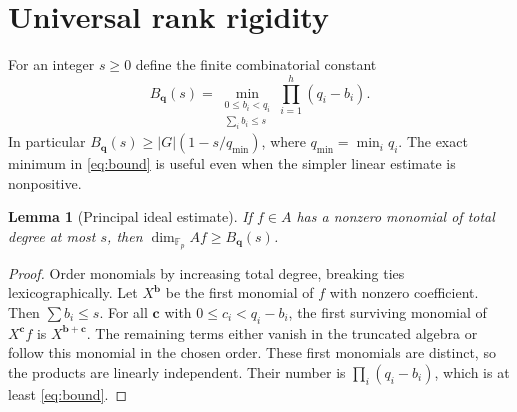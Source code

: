\documentclass[11pt,a4paper]{article}
\newtheorem{lemma}[theorem]{Lemma}
\theoremstyle{definition}
\theoremstyle{remark}
\newcommand{\Fp}{\mathbb F_p}
\begin{document}
\section{Universal rank rigidity}
For an integer $s\ge0$ define the finite combinatorial constant
\begin{equation}\label{eq:bound}
 B_{\mathbf q}(s)=
 \min_{\substack{0\le b_i<q_i\\\sum_i b_i\le s}}
 \prod_{i=1}^h(q_i-b_i).
\end{equation}
In particular $B_{\mathbf q}(s)\ge |G|(1-s/q_{\min})$, where $q_{\min}=\min_i q_i$. The exact minimum in \eqref{eq:bound} is useful even when the simpler linear estimate is nonpositive.

\begin{lemma}[Principal ideal estimate]\label{lem:ideal}
If $f\in A$ has a nonzero monomial of total degree at most $s$, then $\dim_{\Fp}Af\ge B_{\mathbf q}(s)$.
\end{lemma}
\begin{proof}
Order monomials by increasing total degree, breaking ties lexicographically. Let $X^{\mathbf b}$ be the first monomial of $f$ with nonzero coefficient. Then $\sum b_i\le s$. For all $\mathbf c$ with $0\le c_i<q_i-b_i$, the first surviving monomial of $X^{\mathbf c}f$ is $X^{\mathbf b+\mathbf c}$. The remaining terms either vanish in the truncated algebra or follow this monomial in the chosen order. These first monomials are distinct, so the products are linearly independent. Their number is $\prod_i(q_i-b_i)$, which is at least \eqref{eq:bound}.
\end{proof}
\end{document}
